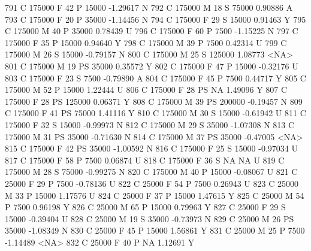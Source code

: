 \documentclass{article}
\begin{document}
\begin{Schunk}
\begin{Soutput}
791       C     175000   F  42         P  15000  -1.29617    N
792       C     175000   M  18         S  75000   0.90886    A
793       C     175000   F  20         P  35000  -1.14456    N
794       C     175000   F  29         S  15000   0.91463    Y
795       C     175000   M  40         P  35000   0.78439    U
796       C     175000   F  60         P   7500  -1.15225    N
797       C     175000   F  35         P  15000   0.94640    Y
798       C     175000   M  39         P   7500   0.42314    U
799       C     175000   M  26         S  15000  -0.79157    N
800       C     175000   M  25         S 125000   1.08773 <NA>
801       C     175000   M  19        PS  35000   0.35572    Y
802       C     175000   F  47         P  15000  -0.32176    U
803       C     175000   F  23         S   7500  -0.79890    A
804       C     175000   F  45         P   7500   0.44717    Y
805       C     175000   M  52         P  15000   1.22444    U
806       C     175000   F  28        PS     NA   1.49096    Y
807       C     175000   F  28        PS 125000   0.06371    Y
808       C     175000   M  39        PS 200000  -0.19457    N
809       C     175000   F  41        PS  75000   1.41116    Y
810       C     175000   M  30         S  15000  -0.61942    U
811       C     175000   F  32         S  15000  -0.99973    N
812       C     175000   M  29         S  35000  -1.07308    N
813       C     175000   M  31        PS  35000  -0.71630    N
814       C     175000   M  37        PS  35000  -0.47005 <NA>
815       C     175000   F  42        PS  35000  -1.00592    N
816       C     175000   F  25         S  15000  -0.97034    U
817       C     175000   F  58         P   7500   0.06874    U
818       C     175000   F  36         S     NA        NA    U
819       C     175000   M  28         S  75000  -0.99275    N
820       C     175000   M  40         P  15000  -0.08067    U
821       C      25000   F  29         P   7500  -0.78136    U
822       C      25000   F  54         P   7500   0.26943    U
823       C      25000   M  33         P  15000   1.17576    U
824       C      25000   F  37         P  15000   1.47615    Y
825       C      25000   M  54         P   7500   0.96198    Y
826       C      25000   M  65         P  15000   0.79963    Y
827       C      25000   F  29         S  15000  -0.39404    U
828       C      25000   M  19         S  35000  -0.73973    N
829       C      25000   M  26        PS  35000  -1.08349    N
830       C      25000   F  45         P  15000   1.56861    Y
831       C      25000   M  25         P   7500  -1.14489 <NA>
832       C      25000   F  40         P     NA   1.12691    Y

\end{Soutput}
\end{Schunk}
\end{document}
